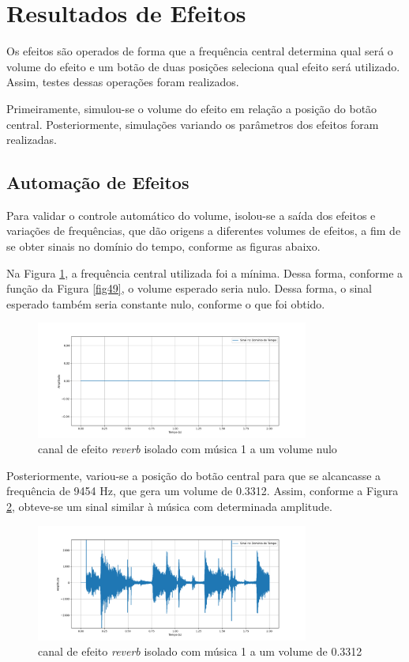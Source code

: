 \section{Resultados de Efeitos}

Os efeitos são operados de forma que a frequência central determina qual será o volume do efeito e um botão de duas posições seleciona qual efeito será utilizado. Assim, testes dessas operações foram realizados. 

Primeiramente, simulou-se o volume do efeito em relação a posição do botão central. Posteriormente, simulações variando os parâmetros dos efeitos foram realizadas. 

\subsection{Automação de Efeitos}

Para validar o controle automático do volume, isolou-se a saída dos efeitos e variações de frequências, que dão origens a diferentes volumes de efeitos, a fim de se obter sinais no domínio do tempo, conforme as figuras abaixo. 

Na Figura \ref{fig66}, a frequência central utilizada foi a mínima. Dessa forma, conforme a função da Figura \ref{fig49}, o volume esperado seria nulo. Dessa forma, o sinal esperado também seria constante nulo, conforme o que foi obtido.

\begin{figure}[h]
	\centering
    \includegraphics[width=0.8\textwidth]{figuras/fig66.png}
	\caption{canal de efeito \textit{reverb} isolado com música 1 a um volume nulo}
	\label{fig66}
\end{figure}

Posteriormente, variou-se a posição do botão central para que se alcancasse a frequência de 9454 Hz, que gera um volume de 0.3312. Assim, conforme a Figura \ref{fig67}, obteve-se um sinal similar à música \cite{track01} com determinada amplitude. 
 
\begin{figure}[h]
	\centering
    \includegraphics[width=0.8\textwidth]{figuras/fig67.png}
	\caption{canal de efeito \textit{reverb} isolado com música 1 a um volume de 0.3312}
	\label{fig67}
\end{figure}

